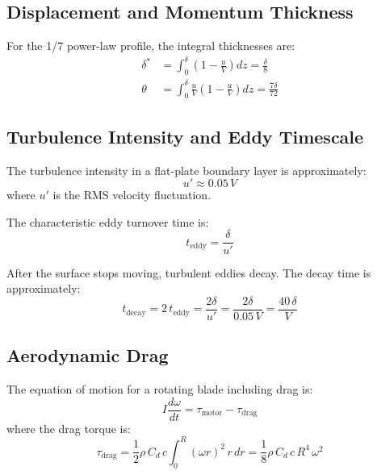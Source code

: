 \documentclass[11pt,a4paper]{article}
\begin{document}
\subsection{Displacement and Momentum Thickness}

For the 1/7 power-law profile, the integral thicknesses are:
\begin{align}
  \delta^* &= \int_0^\delta \left(1 - \frac{u}{V}\right) dz = \frac{\delta}{8}
    \label{eq:delta-star} \\
  \theta &= \int_0^\delta \frac{u}{V}\left(1 - \frac{u}{V}\right) dz = \frac{7\delta}{72}
    \label{eq:theta}
\end{align}

\subsection{Turbulence Intensity and Eddy Timescale}

The turbulence intensity in a flat-plate boundary layer is approximately:
\begin{equation}
  u' \approx 0.05 \, V
  \label{eq:u-prime}
\end{equation}
where $u'$ is the RMS velocity fluctuation.

The characteristic eddy turnover time is:
\begin{equation}
  t_\mathrm{eddy} = \frac{\delta}{u'}
  \label{eq:t-eddy}
\end{equation}

After the surface stops moving, turbulent eddies decay. The decay time is
approximately:
\begin{equation}
  \boxed{t_\mathrm{decay} = 2 \, t_\mathrm{eddy} = \frac{2\delta}{u'} = \frac{2\delta}{0.05\,V} = \frac{40\,\delta}{V}}
  \label{eq:t-decay}
\end{equation}

\subsection{Aerodynamic Drag}

The equation of motion for a rotating blade including drag is:
\begin{equation}
  I \frac{d\omega}{dt} = \tau_\mathrm{motor} - \tau_\mathrm{drag}
  \label{eq:eom-drag}
\end{equation}
where the drag torque is:
\begin{equation}
  \tau_\mathrm{drag} = \frac{1}{2} \rho \, C_d \, c \int_0^R (\omega r)^2 \, r \, dr
    = \frac{1}{8} \rho \, C_d \, c \, R^4 \, \omega^2
  \label{eq:tau-drag}
\end{equation}
\end{document}
